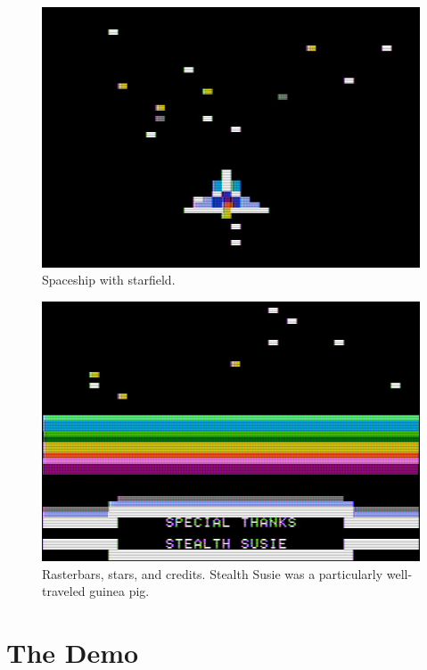 \documentclass[twocolumn]{article}
\begin{document}
\begin{figure}[tb]
\begin{center}
\includegraphics[width=\columnwidth]{figures/m7_screen3.jpg}
\end{center}
\caption{Spaceship with starfield.\label{fig:stars}}
\end{figure}

\begin{figure}[tb]
\begin{center}
\includegraphics[width=\columnwidth]{figures/m7_screen2.jpg}
\end{center}
\caption{Rasterbars, stars, and credits.  Stealth Susie was a particularly
well-traveled guinea pig.
\label{fig:credits}}
\end{figure}


\section{The Demo}
\end{document}

